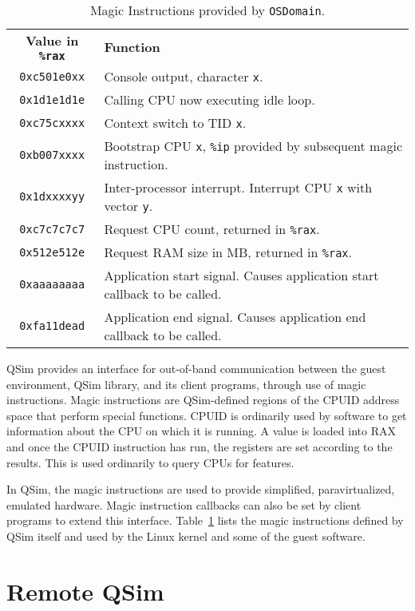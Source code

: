 \documentclass[letterpaper, 10pt]{book}
\begin{document}
\begin{table}
\begin{tabular}{c|l}
  \textbf{Value in \texttt{\%rax}}&\textbf{Function}\\
  \texttt{0xc501e0xx}&Console output, character \texttt{x}.\\
  \texttt{0x1d1e1d1e}&Calling CPU now executing idle loop.\\
  \texttt{0xc75cxxxx}&Context switch to TID \texttt{x}.\\
  \texttt{0xb007xxxx}&Bootstrap CPU \texttt{x}, \texttt{\%ip} provided by
                      subsequent magic instruction.\\
  \texttt{0x1dxxxxyy}&Inter-processor interrupt. Interrupt CPU \texttt{x} with
                      vector \texttt{y}.\\
  \texttt{0xc7c7c7c7}&Request CPU count, returned in \texttt{\%rax}.\\
  \texttt{0x512e512e}&Request RAM size in MB, returned in \texttt{\%rax}.\\
  \texttt{0xaaaaaaaa}&Application start signal. Causes application start 
                      callback to be called.\\
  \texttt{0xfa11dead}&Application end signal. Causes application end callback
                      to be called.\\
\end{tabular}
\caption{Magic Instructions provided by \texttt{OSDomain}.}
\label{table:magic}
\end{table}

QSim provides an interface for out-of-band communication between the guest
environment, QSim library, and its client programs, through use of magic
instructions. Magic instructions are QSim-defined regions of the CPUID address
space that perform special functions. CPUID is ordinarily used by software to
get information about the CPU on which it is running. A value is loaded into RAX
and once the CPUID instruction has run, the registers are set according to the
results. This is used ordinarily to query CPUs for features.

In QSim, the magic instructions are used to provide simplified, paravirtualized,
emulated hardware. Magic instruction callbacks can also be set by client
programs to extend this interface. Table~\ref{table:magic} lists the magic
instructions defined by QSim itself and used by the Linux kernel and some of the
guest software.

\chapter{Remote QSim} \label{chap:remote}
\end{document}
